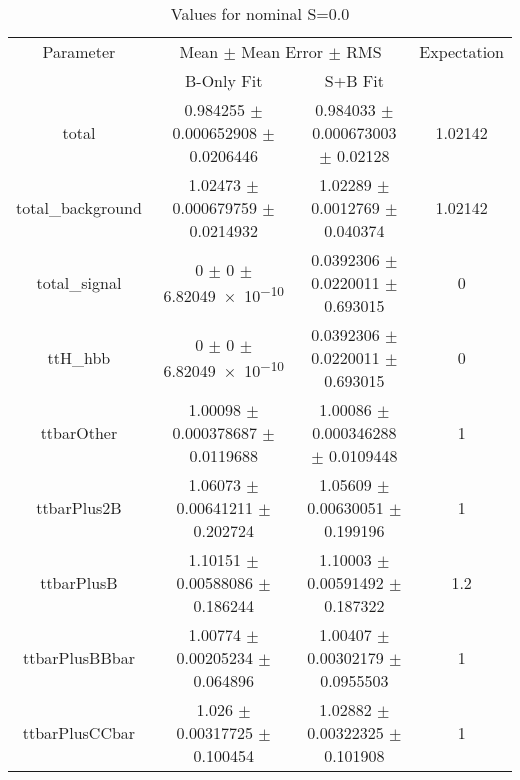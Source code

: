 \begin{table}
\centering
\caption{Values for nominal S=0.0}
\begin{tabular}{cccc}
\toprule
Parameter & \multicolumn{2}{c}{Mean $\pm$ Mean Error $\pm$ RMS} & Expectation\\
 & B-Only Fit & S+B Fit & \\
\midrule
total & \num{0.984255} $\pm$ \num{0.000652908} $\pm$ \num{0.0206446} & \num{0.984033} $\pm$ \num{0.000673003} $\pm$ \num{0.02128} & \num{1.02142}\\
total\_background & \num{1.02473} $\pm$ \num{0.000679759} $\pm$ \num{0.0214932} & \num{1.02289} $\pm$ \num{0.0012769} $\pm$ \num{0.040374} & \num{1.02142}\\
total\_signal & \num{0} $\pm$ \num{0} $\pm$ \num{6.82049e-10} & \num{0.0392306} $\pm$ \num{0.0220011} $\pm$ \num{0.693015} & \num{0}\\
ttH\_hbb & \num{0} $\pm$ \num{0} $\pm$ \num{6.82049e-10} & \num{0.0392306} $\pm$ \num{0.0220011} $\pm$ \num{0.693015} & \num{0}\\
ttbarOther & \num{1.00098} $\pm$ \num{0.000378687} $\pm$ \num{0.0119688} & \num{1.00086} $\pm$ \num{0.000346288} $\pm$ \num{0.0109448} & \num{1}\\
ttbarPlus2B & \num{1.06073} $\pm$ \num{0.00641211} $\pm$ \num{0.202724} & \num{1.05609} $\pm$ \num{0.00630051} $\pm$ \num{0.199196} & \num{1}\\
ttbarPlusB & \num{1.10151} $\pm$ \num{0.00588086} $\pm$ \num{0.186244} & \num{1.10003} $\pm$ \num{0.00591492} $\pm$ \num{0.187322} & \num{1.2}\\
ttbarPlusBBbar & \num{1.00774} $\pm$ \num{0.00205234} $\pm$ \num{0.064896} & \num{1.00407} $\pm$ \num{0.00302179} $\pm$ \num{0.0955503} & \num{1}\\
ttbarPlusCCbar & \num{1.026} $\pm$ \num{0.00317725} $\pm$ \num{0.100454} & \num{1.02882} $\pm$ \num{0.00322325} $\pm$ \num{0.101908} & \num{1}\\
\bottomrule
\end{tabular}
\end{table}